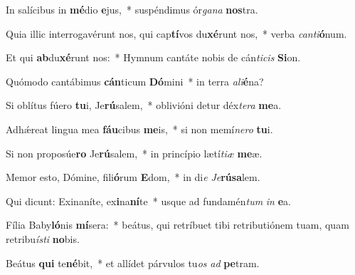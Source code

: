 \item In salícibus in \textbf{mé}dio \textbf{e}jus,~* suspéndimus ór\textit{ga}\textit{na} \textbf{nos}tra.
\item Quia illic interrogavérunt nos, qui cap\textbf{tí}vos du\textbf{xé}runt nos,~* verba \textit{can}\textit{ti}\textbf{ó}num.
\item Et qui \textbf{ab}du\textbf{xé}runt nos:~* Hymnum cantáte nobis de cán\textit{ti}\textit{cis} \textbf{Si}on.
\item Quómodo cantábimus \textbf{cán}ticum \textbf{Dó}mini~* in terra \textit{a}\textit{li}\textbf{é}na?
\item Si oblítus fúero \textbf{tu}i, Je\textbf{rú}salem,~* oblivióni detur déx\textit{te}\textit{ra} \textbf{me}a.
\item Adhǽreat lingua mea \textbf{fáu}cibus \textbf{me}is,~* si non memí\textit{ne}\textit{ro} \textbf{tu}i.
\item Si non proposúe\textbf{ro} Je\textbf{rú}salem,~* in princípio lætí\textit{ti}\textit{æ} \textbf{me}æ.
\item Memor esto, Dómine, fili\textbf{ó}rum \textbf{E}dom,~* in di\textit{e} \textit{Je}\textbf{rú}\textbf{sa}lem.
\item Qui dicunt: Exinaníte, ex\textbf{i}na\textbf{ní}te~* usque ad fundamén\textit{tum} \textit{in} \textbf{e}a.
\item Fília Baby\textbf{ló}nis \textbf{mí}sera:~* beátus, qui retríbuet tibi retributiónem tuam, quam retribu\textit{ís}\textit{ti} \textbf{no}bis.
\item Beátus \textbf{qui} te\textbf{né}bit,~* et allídet párvulos tu\textit{os} \textit{ad} \textbf{pe}tram.
